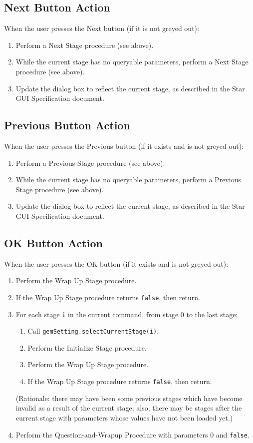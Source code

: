 \documentclass[11pt]{article}
\begin{document}
\subsection{Next Button Action}

When the user presses the Next button (if it is not greyed out):
\begin{enumerate}
\item Perform a Next Stage procedure (see above).
\item While the current stage has no queryable parameters, perform
  a Next Stage procedure (see above).
\item Update the dialog box to reflect the current stage, as described
  in the Star GUI Specification document.
\end{enumerate}

\subsection{Previous Button Action}

When the user presses the Previous button (if it exists and is not greyed
out):
\begin{enumerate}
\item Perform a Previous Stage procedure (see above).
\item While the current stage has no queryable parameters, perform
  a Previous Stage procedure (see above).
\item Update the dialog box to reflect the current stage, as described
  in the Star GUI Specification document.
\end{enumerate}

\subsection{OK Button Action}

When the user presses the OK button (if it exists and is not greyed
out):
\begin{enumerate}
\item Perform the Wrap Up Stage procedure.
\item If the Wrap Up Stage procedure returns {\tt false}, then return.
\item For each stage \verb/i/ in the current command, from stage 0 to the
  last stage:
  \begin{enumerate}
  \item Call {\tt gemSetting.selectCurrentStage(i)}.
  \item Perform the Initialize Stage procedure.
  \item Perform the Wrap Up Stage procedure.
  \item If the Wrap Up Stage procedure returns {\tt false}, then return.
  \end{enumerate}
  (Rationale:  there may have been some previous stages which have
  become invalid as a result of the current stage; also, there may be
  stages after the current stage with parameters whose
  values have not been loaded yet.)
\item Perform the Question-and-Wrapup Procedure with parameters
  0 and {\tt false}.
\end{enumerate}
\end{document}
